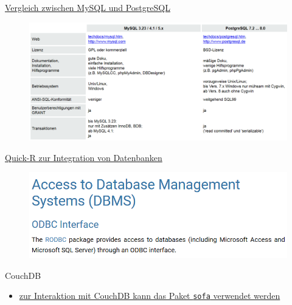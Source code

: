 \documentclass[ignorenonframetext,]{beamer}
\providecommand{\tightlist}{%
\setlength{\itemsep}{0pt}\setlength{\parskip}{0pt}}
\begin{document}
\begin{frame}{\href{http://www.torsten-horn.de/techdocs/sql.htm}{Vergleich
zwischen MySQL und PostgreSQL}}

\begin{figure}[htbp]
\centering
\includegraphics{figure/VergleichDatenbanken.PNG}
\caption{}
\end{figure}

\end{frame}

\begin{frame}{\href{http://www.statmethods.net/input/dbinterface.html}{Quick-R
zur Integration von Datenbanken}}

\begin{figure}[htbp]
\centering
\includegraphics{figure/quickr_AccessDatabases.PNG}
\caption{}
\end{figure}

\end{frame}

\begin{frame}[fragile]{CouchDB}

\begin{itemize}
\tightlist
\item
  \href{https://github.com/ropensci/sofa}{zur Interaktion mit CouchDB
  kann das Paket \texttt{sofa} verwendet werden}
\end{itemize}

\end{frame}
\end{document}
